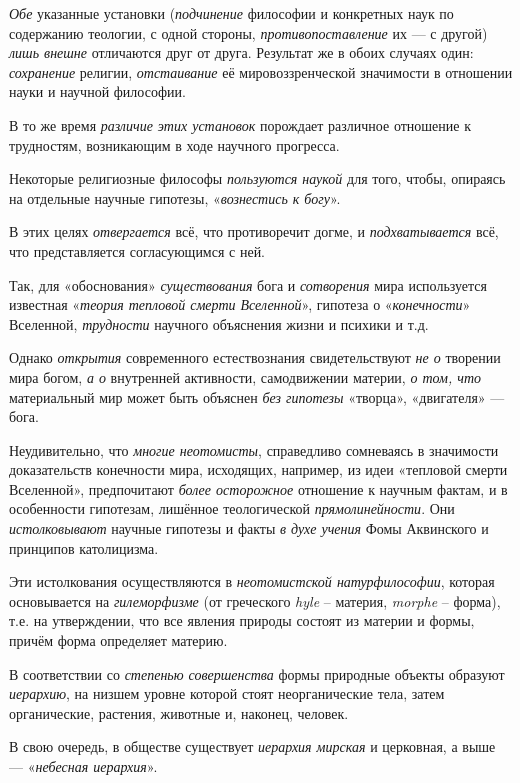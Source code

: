 \documentclass[a4paper,14pt,russian]{extreport}
\begin{document}
\emph{Обе} указанные установки (\emph{подчинение} философии и конкретных наук по содержанию теологии, с одной стороны, \emph{противопоставление} их --- с другой) \emph{лишь внешне} отличаются друг от друга. Результат же в обоих случаях один: \emph{сохранение} религии, \emph{отстаивание} её мировоззренческой значимости в отношении науки и научной философии.

В то же время \emph{различие этих установок} порождает различное отношение к трудностям, возникающим в ходе научного прогресса.

Некоторые религиозные философы \emph{пользуются наукой} для того, чтобы, опираясь на отдельные научные гипотезы, «\emph{вознестись к богу}».

В этих целях \emph{отвергается} всё, что противоречит догме, и \emph{подхватывается} всё, что представляется согласующимся с ней.

Так, для «обоснования» \emph{существования} бога и \emph{сотворения} мира используется известная «\emph{теория тепловой смерти Вселенной}», гипотеза о «\emph{конечности}» Вселенной, \emph{трудности} научного объяснения жизни и психики и т.д.

Однако \emph{открытия} современного естествознания свидетельствуют \emph{не о} творении мира богом, \emph{а о} внутренней активности, самодвижении материи, \emph{о том, что} материальный мир может быть объяснен \emph{без гипотезы} «творца», «двигателя» --- бога.

Неудивительно, что \emph{многие неотомисты}, справедливо сомневаясь в значимости доказательств конечности мира, исходящих, например, из идеи «тепловой смерти Вселенной», предпочитают \emph{более осторожное} отношение к научным фактам, и в особенности гипотезам, лишённое теологической \emph{прямолинейности}. Они \emph{истолковывают} научные гипотезы и факты \emph{в духе учения} Фомы Аквинского и принципов католицизма.

Эти истолкования осуществляются в \emph{неотомистской натурфилософии}, которая основывается на \emph{гилеморфизме} (от греческого \emph{hyle} -- материя, \emph{morphe} -- форма), т.е. на утверждении, что все явления природы состоят из материи и формы, причём форма определяет материю.

В соответствии со \emph{степенью совершенства} формы природные объекты образуют \emph{иерархию}, на низшем уровне которой стоят неорганические тела, затем органические, растения, животные и, наконец, человек.

В свою очередь, в обществе существует \emph{иерархия мирская} и церковная, а выше --- «\emph{небесная иерархия}».
\end{document}

